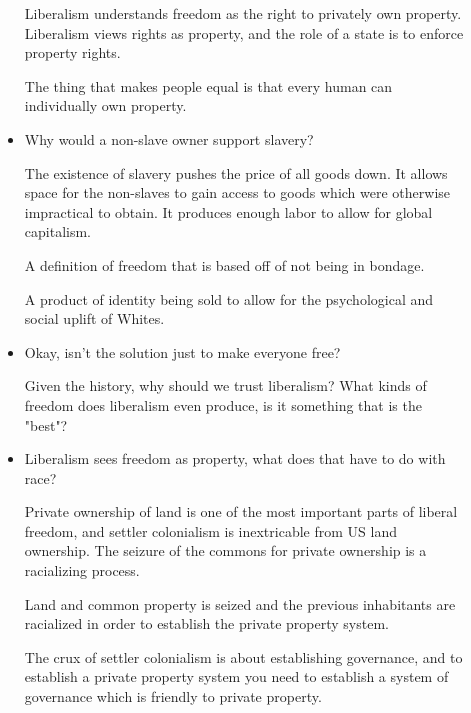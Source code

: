 \documentclass{report}
\begin{document}
\begin{description}
\begin{itemize}
                \vspace{10}

                Liberalism understands freedom as the right to privately own property.
                Liberalism views rights as property, and the role of a state is to
                enforce property rights.

                The thing that makes people equal is that every human can individually
                own property. 

            \item Why would a non-slave owner support slavery?

                The existence of slavery pushes the price of all
                goods down. It allows space for the non-slaves to gain access to goods
                which were otherwise impractical to obtain. It produces enough
                labor to allow for global capitalism.

                A definition of freedom that is based off of not being
                in bondage.

                A product of identity being sold to allow for the psychological and
                social uplift of Whites.

            \item Okay, isn't the solution just to make everyone free?

                Given the history, why should we trust liberalism? What kinds
                of freedom does liberalism even produce, is it something that
                is the "best"? 

            \item Liberalism sees freedom as property, what does that have to do
                with race?

                Private ownership of land is one of the most important parts of
                liberal freedom, and settler colonialism is inextricable from
                US land ownership. The seizure of the commons for private
                ownership is a racializing process.

                Land and common property is seized and the previous inhabitants are
                racialized in order to establish the private property system.

                The crux of settler colonialism is about establishing governance,
                and to establish a private property system you need to establish
                a system of governance which is friendly to private property.


\end{itemize}
\end{description}
\end{document}
